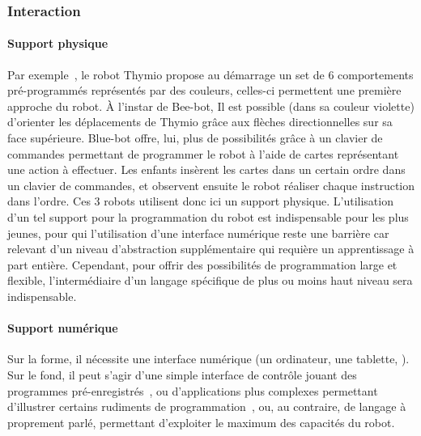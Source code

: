         \subsubsection{Interaction}
            \paragraph{Support physique}
                Par exemple~, le robot Thymio propose au démarrage un set de 6 comportements pré-programmés représentés par des couleurs, celles-ci permettent une première approche du robot. À l'instar de Bee-bot, Il est possible (dans sa couleur violette) d'orienter les déplacements de Thymio grâce aux flèches directionnelles sur sa face supérieure. Blue-bot offre, lui, plus de possibilités grâce à un clavier de commandes permettant de programmer le robot à l’aide de cartes représentant une action à effectuer. Les enfants insèrent les cartes dans un certain ordre dans un clavier de commandes, et observent ensuite le robot réaliser chaque instruction dans l’ordre. 
                Ces 3 robots utilisent donc ici un support physique. L’utilisation d’un tel support pour la programmation du robot est indispensable pour les plus jeunes, pour qui l'utilisation d'une interface numérique reste une barrière car relevant d'un niveau d'abstraction supplémentaire qui requière un apprentissage à part entière.
                Cependant, pour offrir des possibilités de programmation large et flexible, l'intermédiaire d'un langage spécifique de plus ou moins haut niveau sera indispensable.
            \paragraph{Support numérique}
                Sur la forme, il nécessite une interface numérique (\eg un ordinateur, une tablette, \etc).
                Sur le fond, il peut s'agir d'une simple interface de contrôle jouant des programmes pré-enregistrés~, ou d'applications plus complexes permettant d'illustrer certains rudiments de programmation~, ou, au contraire, de langage à proprement parlé, permettant d'exploiter le maximum des capacités du robot.
